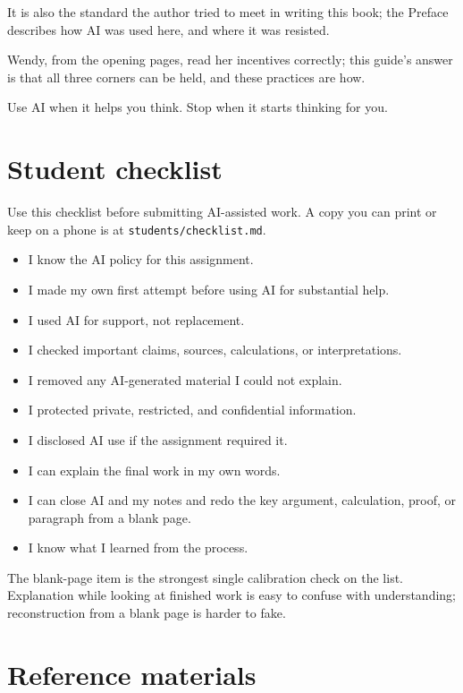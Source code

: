 \documentclass{SIAMbook2023}
\begin{document}
It is also the standard the author tried to meet in writing this book; the Preface describes how AI was used here, and where it was resisted.

Wendy, from the opening pages, read her incentives correctly; this guide's answer is that all three corners can be held, and these practices are how.

Use AI when it helps you think. Stop when it starts thinking for you.

\clearpage
\section{Student checklist}
\label{sec:student-checklist}%

Use this checklist before submitting AI-assisted work. A copy you can print or keep on a phone is at \texttt{students/checklist.md}.

\begin{itemize}[label=$\square$]
\item I know the AI policy for this assignment.
\item I made my own first attempt before using AI for substantial help.
\item I used AI for support, not replacement.
\item I checked important claims, sources, calculations, or interpretations.
\item I removed any AI-generated material I could not explain.
\item I protected private, restricted, and confidential information.
\item I disclosed AI use if the assignment required it.
\item I can explain the final work in my own words.
\item I can close AI and my notes and redo the key argument, calculation, proof, or paragraph from a blank page.
\item I know what I learned from the process.
\end{itemize}

The blank-page item is the strongest single calibration check on the list. Explanation while looking at finished work is easy to confuse with understanding; reconstruction from a blank page is harder to fake.

\section{Reference materials}
\label{sec:part1-refs}%
\end{document}
